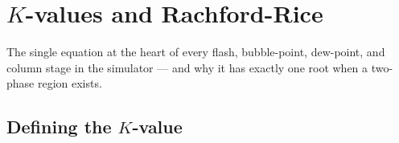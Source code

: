 \documentclass[11pt,a4paper]{article}
\begin{document}
\section{\texorpdfstring{$K$}{K}-values and Rachford-Rice}\label{ch:rr}

\begin{whatyoulllearn}
The single equation at the heart of every flash, bubble-point, dew-point,
and column stage in the simulator --- and why it has exactly one root
when a two-phase region exists.
\end{whatyoulllearn}

\subsection{Defining the $K$-value}
\end{document}
